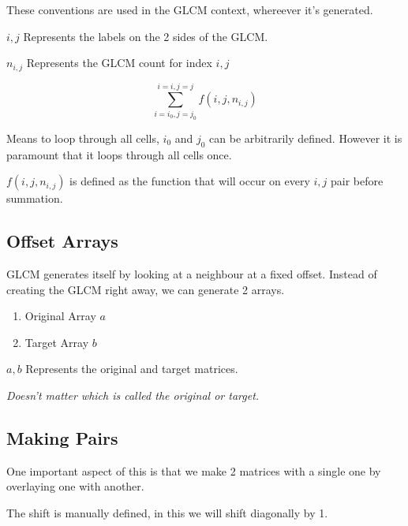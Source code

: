 \documentclass[article,oneside]{memoir}
\begin{document}
These conventions are used in the GLCM context, whereever it's generated.

$i, j$ Represents the labels on the 2 sides of the GLCM.

$n_{i, j}$ Represents the GLCM count for index $i, j$

$$\sum_{i=i_0,j=j_0}^{i=i,j=j}f(i, j, n_{i,j})$$

Means to loop through all cells, $i_0$ and $j_0$ can be arbitrarily defined. However it is paramount that it loops through all cells once.

$f(i, j, n_{i,j})$ is defined as the function that will occur on every $i, j$ pair before summation.

\subsection{Offset Arrays}

GLCM generates itself by looking at a neighbour at a fixed offset. Instead of creating the GLCM right away, we can generate 2 arrays.

\begin{enumerate}
\item{Original Array $a$}
\item{Target Array $b$}
\end{enumerate}

$a, b$ Represents the original and target matrices.

\textit{Doesn't matter which is called the original or target.}

\subsection{Making Pairs}

One important aspect of this is that we make 2 matrices with a single one by overlaying one with another.

The shift is manually defined, in this we will shift diagonally by 1.
\end{document}

